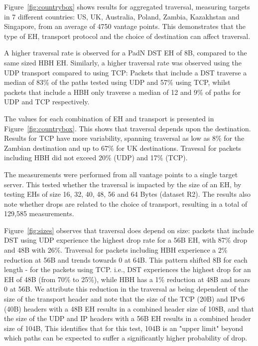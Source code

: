 \documentclass[conference]{IEEEtran}
\begin{document}
Figure~\ref{fig:countrybox} shows results for aggregated traversal, measuring targets in 7 different countries: US, UK, Australia, Poland, Zambia, Kazakhstan and Singapore, from an average of 4750 vantage points. This demonstrates that the type of EH, transport protocol and the choice of destination can affect traversal.

A higher traversal rate is observed for a PadN DST EH of 8B, compared to the same sized HBH EH. Similarly, a higher traversal rate was observed using the UDP transport compared to using TCP: Packets that include a DST traverse a median of 83\% of the paths tested using UDP and 57\% using TCP, whilst packets that include a HBH only traverse a median of 12 and 9\% of paths for UDP and TCP respectively.

The values for each combination of EH and transport is presented in Figure~\ref{fig:countrybox}. This shows that traversal depends upon the destination. Results for TCP have more variability, spanning traversal as low as 8\% for the Zambian destination and up to 67\% for UK destinations. Travesal for packets including HBH did not exceed 20\% (UDP) and 17\% (TCP).

The measurements were performed from all vantage points to a single target server. This tested whether the traversal is impacted by the size of an EH, by testing EHs of size 16, 32, 40, 48, 56 and 64 Bytes (dataset R2). The results also note whether drops are related to the choice of transport, resulting in a total of 129,585 measurements.
 
Figure~\ref{fig:sizes} observes that traversal does depend on size: packets that include DST using UDP experience the highest drop rate for a 56B EH, with  87\% drop and 48B with 26\%. Traversal for packets including HBH experience a 2\% reduction at 56B and trends towards 0 at 64B.
This pattern shifted 8B for each length - for the packets  using TCP. i.e., DST experiences the highest drop for an EH of 48B (from 70\% to 25\%), while HBH has a 1\% reduction at 48B and nears 0 at 56B.
We attribute this reduction in the traversal as being dependent of the size of the transport header and note that the size of the TCP (20B) and IPv6 (40B) headers with a 48B EH results in a combined header size of 108B, and that the size of the UDP and IP headers with a 56B EH results in a combined header size of 104B, This identifies that for this test,  104B is an "upper limit" beyond which paths can be expected to suffer a significantly higher probability of drop.
\end{document}
